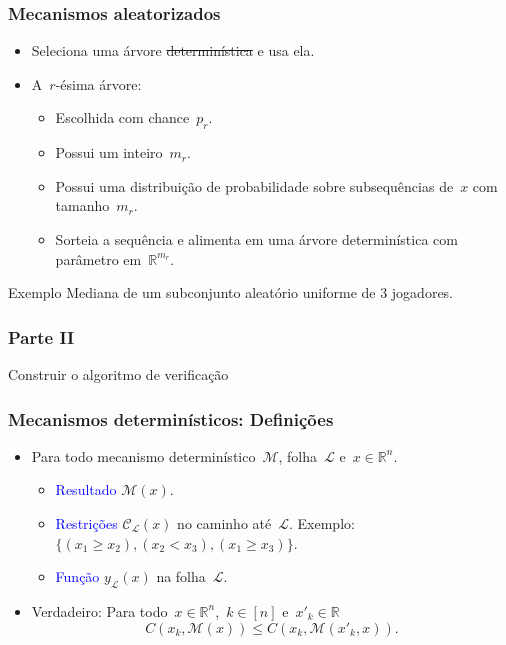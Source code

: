\documentclass[usenames,dvipsnames]{beamer}
\begin{document}
\begin{frame}
\frametitle{Mecanismos aleatorizados}
\begin{itemize}
    \item Seleciona uma árvore \sout{determinística} e usa ela.
    \item A~$r$-ésima árvore:
    \begin{itemize}
        \item Escolhida com chance~$p_r$.
        \item Possui um inteiro~$m_r$.
        \item Possui uma distribuição de probabilidade sobre subsequências de~$x$ com tamanho~$m_r$.
        \item Sorteia a sequência e alimenta em uma árvore determinística com parâmetro em~$\mathbb{R}^{m_r}$.
    \end{itemize}
\end{itemize}
\begin{block}{Exemplo}
Mediana de um subconjunto aleatório uniforme de 3 jogadores.
\end{block}
\end{frame}


\begin{frame}
\frametitle{Parte II}
Construir o algoritmo de verificação
\end{frame}

\begin{frame}
\frametitle{Mecanismos determinísticos: Definições}

\begin{itemize}
\item Para todo mecanismo determinístico~$\mathcal{M}$, folha~$\mathcal{L}$ e~$x \in \mathbb{R}^n$.
\begin{itemize}
    \item \textcolor{blue}{Resultado} $\mathcal{M}(x)$.
    \item \textcolor{blue}{Restrições} $\mathcal{C}_\mathcal{L}(x)$ no caminho até~$\mathcal{L}$. Exemplo: $\{(x_1 \geq x_2),(x_2 < x_3),(x_1 \geq x_3)\}$.
    \item \textcolor{blue}{Função} $y_\mathcal{L}(x)$ na folha~$\mathcal{L}$.
\end{itemize}
\pause
\item Verdadeiro: Para todo~$x \in \mathbb{R}^n$,~$k \in [n]$ e~$x'_k \in \mathbb{R}$
$$C(x_k,\mathcal{M}(x)) \leq C(x_k,\mathcal{M}(x'_k,x)) \text{.}$$
\end{itemize}
\end{frame}
\end{document}
